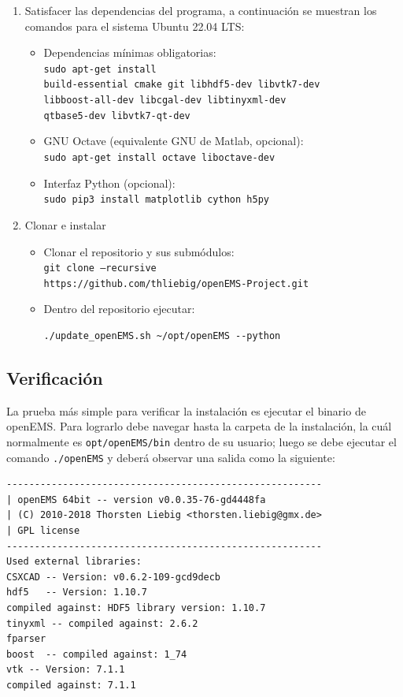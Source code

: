 \documentclass[
    11pt,
    spanish,
	a4paper
]{article}
\begin{document}
\begin{enumerate}
  \item Satisfacer las dependencias del programa, a continuación se muestran los
    comandos para el sistema Ubuntu 22.04 LTS:
    \begin{itemize}
      \item Dependencias mínimas obligatorias:\\
        \texttt{sudo apt-get install\\
        build-essential cmake git libhdf5-dev libvtk7-dev\\
        libboost-all-dev libcgal-dev libtinyxml-dev\\
        qtbase5-dev libvtk7-qt-dev}
      \item GNU Octave (equivalente GNU de Matlab, opcional):\\
        \texttt{sudo apt-get install octave liboctave-dev}
      \item Interfaz Python (opcional):\\
        \texttt{sudo pip3 install matplotlib cython h5py}
    \end{itemize}
  \item Clonar e instalar
    \begin{itemize}
      \item Clonar el repositorio y sus submódulos:\\
        \texttt{git clone --recursive\\
          https://github.com/thliebig/openEMS-Project.git}
      \item Dentro del repositorio ejecutar:
        \begin{verbatim}
./update_openEMS.sh ~/opt/openEMS --python
        \end{verbatim}
    \end{itemize}
\end{enumerate}

\subsection{Verificación}
\label{sub:overificacion}

La prueba más simple para verificar la instalación es ejecutar el binario de
openEMS.
Para lograrlo debe navegar hasta la carpeta de la instalación, la cuál
normalmente es \texttt{opt/openEMS/bin} dentro de su usuario; luego se debe ejecutar
el comando \texttt{./openEMS} y deberá observar una salida como la siguiente:

\begin{verbatim}
--------------------------------------------------------
| openEMS 64bit -- version v0.0.35-76-gd4448fa
| (C) 2010-2018 Thorsten Liebig <thorsten.liebig@gmx.de>
| GPL license
--------------------------------------------------------
Used external libraries:
CSXCAD -- Version: v0.6.2-109-gcd9decb
hdf5   -- Version: 1.10.7
compiled against: HDF5 library version: 1.10.7
tinyxml -- compiled against: 2.6.2
fparser
boost  -- compiled against: 1_74
vtk -- Version: 7.1.1
compiled against: 7.1.1
\end{verbatim}
\end{document}
